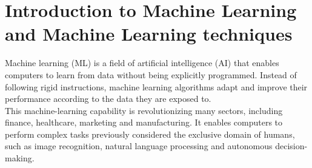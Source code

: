 \documentclass[
]{book}
\newenvironment{Shaded}{\begin{snugshade}}{\end{snugshade}}
\newcommand{\AttributeTok}[1]{\textcolor[rgb]{0.13,0.29,0.53}{#1}}
\newcommand{\CommentTok}[1]{\textcolor[rgb]{0.56,0.35,0.01}{\textit{#1}}}
\newcommand{\ConstantTok}[1]{\textcolor[rgb]{0.56,0.35,0.01}{#1}}
\newcommand{\FloatTok}[1]{\textcolor[rgb]{0.00,0.00,0.81}{#1}}
\newcommand{\FunctionTok}[1]{\textcolor[rgb]{0.13,0.29,0.53}{\textbf{#1}}}
\newcommand{\NormalTok}[1]{#1}
\newcommand{\OtherTok}[1]{\textcolor[rgb]{0.56,0.35,0.01}{#1}}
\newcommand{\SpecialCharTok}[1]{\textcolor[rgb]{0.81,0.36,0.00}{\textbf{#1}}}
\newcommand{\StringTok}[1]{\textcolor[rgb]{0.31,0.60,0.02}{#1}}
\begin{document}
\begin{Shaded}
\end{Shaded}

\hypertarget{introduction-to-machine-learning-and-machine-learning-techniques}{%
\chapter{Introduction to Machine Learning and Machine Learning techniques}\label{introduction-to-machine-learning-and-machine-learning-techniques}}

Machine learning (ML) is a field of artificial intelligence (AI) that enables computers to learn from data without being explicitly programmed. Instead of following rigid instructions, machine learning algorithms adapt and improve their performance according to the data they are exposed to.\\
This machine-learning capability is revolutionizing many sectors, including finance, healthcare, marketing and manufacturing. It enables computers to perform complex tasks previously considered the exclusive domain of humans, such as image recognition, natural language processing and autonomous decision-making.
\end{document}
